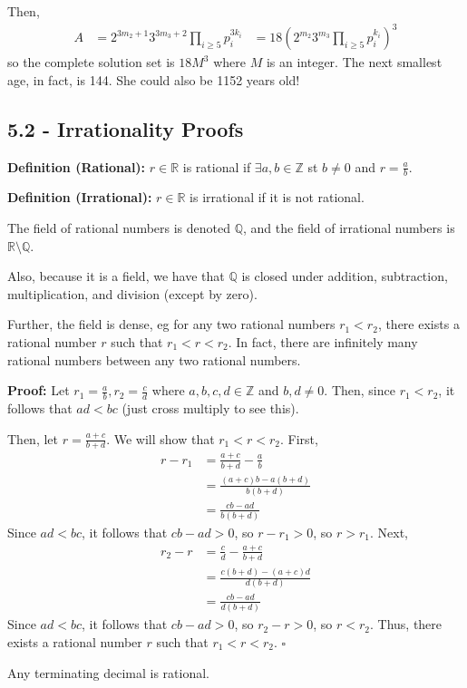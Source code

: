 \documentclass{article}
\newcommand*{\qed}{\hfill$\square$}%
\newcommand*{\rr}{\mathbb{R}}%
\newcommand*{\zz}{\mathbb{Z}}%
\newenvironment{aside}{\begin{siderules}\setlength{\leftskip}{0.3cm}}{\end{siderules}\setlength{\leftskip}{0pt}}
\begin{document}
Then, \begin{align*}
    A&=2^{3m_2+1}3^{3m_3+2}\prod_{i\geq 5} p_i^{3k_i}
    &=18(2^{m_2}3^{m_3}\prod_{i\geq 5} p_i^{k_i})^3
\end{align*} so the complete solution set is $18M^3$ where $M$ is an integer. The next smallest age, in fact, is 144. She could also be 1152 years old!

\subsection{5.2 - Irrationality Proofs}

\textbf{Definition (Rational):} $r\in \rr$ is rational if $\exists a,b\in \zz$ st $b\neq 0$ and $r=\frac{a}{b}$.

\textbf{Definition (Irrational):} $r\in \rr$ is irrational if it is not rational.

\newcommand*{\qq}{\mathbb{Q}}

\begin{aside}
The field of rational numbers is denoted $\qq$, and the field of irrational numbers is $\rr\setminus \qq$.

Also, because it is a field, we have that $\qq$ is closed under addition, subtraction, multiplication, and division (except by zero). 

Further, the field is dense, eg for any two rational numbers $r_1<r_2$, there exists a rational number $r$ such that $r_1<r<r_2$. In fact, there are infinitely many rational numbers between any two rational numbers.

\textbf{Proof:} Let $r_1=\frac{a}{b}, r_2=\frac{c}{d}$ where $a,b,c,d\in \zz$ and $b,d\neq 0$. Then, since $r_1<r_2$, it follows that $ad<bc$ (just cross multiply to see this).

Then, let $r=\frac{a+c}{b+d}$. We will show that $r_1<r<r_2$. First, \begin{align*}
    r-r_1 &= \frac{a+c}{b+d} - \frac{a}{b} \\
          &= \frac{(a+c)b - a(b+d)}{b(b+d)} \\
          &= \frac{cb - ad}{b(b+d)}
\end{align*}Since $ad<bc$, it follows that $cb-ad>0$, so $r-r_1>0$, so $r>r_1$. Next, \begin{align*}
    r_2-r &= \frac{c}{d} - \frac{a+c}{b+d} \\
          &= \frac{c(b+d) - (a+c)d}{d(b+d)} \\
          &= \frac{cb - ad}{d(b+d)}
\end{align*}Since $ad<bc$, it follows that $cb-ad>0$, so $r_2-r>0$, so $r<r_2$. Thus, there exists a rational number $r$ such that $r_1<r<r_2$. \qed

Any terminating decimal is rational.

\end{aside}
\end{document}
